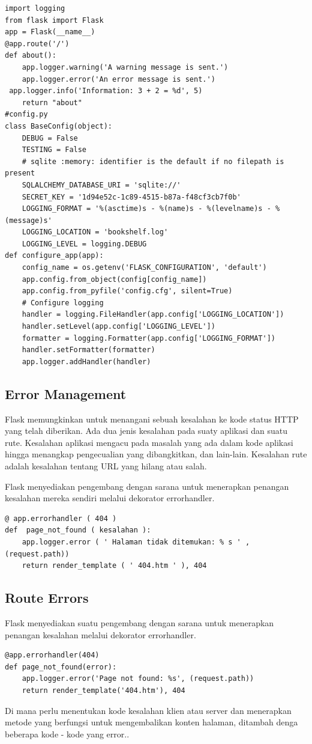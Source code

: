 \begin{verbatim}
import logging
from flask import Flask
app = Flask(__name__)
@app.route('/')
def about():
    app.logger.warning('A warning message is sent.')
    app.logger.error('An error message is sent.')
 app.logger.info('Information: 3 + 2 = %d', 5)
    return "about"
#config.py
class BaseConfig(object):
    DEBUG = False
    TESTING = False
    # sqlite :memory: identifier is the default if no filepath is present
    SQLALCHEMY_DATABASE_URI = 'sqlite://'
    SECRET_KEY = '1d94e52c-1c89-4515-b87a-f48cf3cb7f0b'
    LOGGING_FORMAT = '%(asctime)s - %(name)s - %(levelname)s - %(message)s'
    LOGGING_LOCATION = 'bookshelf.log'
    LOGGING_LEVEL = logging.DEBUG
def configure_app(app):
    config_name = os.getenv('FLASK_CONFIGURATION', 'default')
    app.config.from_object(config[config_name])
    app.config.from_pyfile('config.cfg', silent=True)
    # Configure logging
    handler = logging.FileHandler(app.config['LOGGING_LOCATION'])
    handler.setLevel(app.config['LOGGING_LEVEL'])
    formatter = logging.Formatter(app.config['LOGGING_FORMAT'])
    handler.setFormatter(formatter)
    app.logger.addHandler(handler)
\end{verbatim}

\subsection{Error Management}
Flask memungkinkan untuk menangani sebuah kesalahan ke kode status HTTP yang telah diberikan. Ada dua jenis kesalahan pada suaty aplikasi dan suatu rute. Kesalahan aplikasi mengacu pada masalah yang ada dalam kode aplikasi hingga menangkap pengecualian yang dibangkitkan, dan lain-lain. Kesalahan rute adalah kesalahan tentang URL yang hilang atau salah.

Flask menyediakan pengembang dengan sarana untuk menerapkan penangan kesalahan mereka sendiri melalui dekorator errorhandler.
\begin{verbatim}
@ app.errorhandler ( 404 )
def  page_not_found ( kesalahan ):
	app.logger.error ( ' Halaman tidak ditemukan: % s ' , (request.path))
	return render_template ( ' 404.htm ' ), 404
 \end{verbatim}

\subsection{Route Errors}
Flask menyediakan suatu pengembang dengan sarana untuk menerapkan penangan kesalahan melalui dekorator errorhandler.
\begin{verbatim}
@app.errorhandler(404)
def page_not_found(error):
	app.logger.error('Page not found: %s', (request.path))
	return render_template('404.htm'), 404
\end{verbatim}
Di mana perlu menentukan kode kesalahan klien atau server dan menerapkan metode yang berfungsi untuk mengembalikan konten halaman, ditambah denga beberapa kode - kode yang error..

